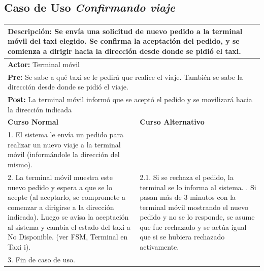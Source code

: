 \documentclass[a4paper]{article}
\begin{document}
\subsection{Caso de Uso \textit{Confirmando viaje}}
\begin{center}
\begin{tabular}{|p{8cm} | p{8cm}|}
\hline
\multicolumn{2}{|p{16cm}|}{\textbf{Descripci\'on:} Se env\'ia una solicitud de nuevo pedido a la terminal m\'ovil del taxi elegido. Se confirma la aceptaci\'on del pedido, y se comienza a dirigir hacia la direcci\'on desde donde se pidi\'o el taxi. } \\
\hline
\multicolumn{2}{|p{15cm}|}{\textbf{Actor:} Terminal m\'ovil} \\
\hline
\multicolumn{2}{|p{15cm}|}{\textbf{Pre:} Se sabe a qu\'e taxi se le pedir\'a que realice el viaje. Tambi\'en se sabe la direcci\'on desde donde se pidi\'o el viaje.} \\
\hline
\multicolumn{2}{|p{15cm}|}{\textbf{Post:} La terminal m\'ovil inform\'o que se acept\'o el pedido y se movilizar\'a hacia la direcci\'on indicada}\\
\hline
\textbf{Curso Normal}  & \textbf{Curso Alternativo} \\ \hline
1. El sistema le env\'ia un pedido para realizar un nuevo viaje a la terminal m\'ovil (inform\'andole la direcci\'on del mismo). & \\ \hline %
2. La terminal m\'ovil muestra este nuevo pedido y espera a que se lo acepte (al aceptarlo, se compromete a comenzar a dirigirse a la direcci\'on indicada). Luego se avisa la aceptaci\'on al sistema y cambia el estado del taxi a No Disponible. (ver FSM, Terminal en Taxi i). & 2.1. Si se rechaza el pedido, la terminal se lo informa al sistema. \newline 2.2. Si pasan m\'as de 3 minutos con la terminal m\'ovil mostrando el nuevo pedido y no se lo responde, se asume que fue rechazado y se act\'ua igual que si se hubiera rechazado activamente. \\ \hline
3. Fin de caso de uso. & \\ \hline
\end{tabular}
\end{center}
\end{document}
